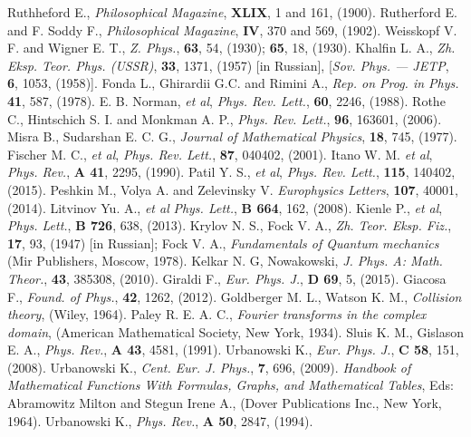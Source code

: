 \documentclass[12pt]{article}
\begin{document}
\begin{thebibliography}{19}
Ruthheford E.,
  {\em  Philosophical Magazine}, {\bf XLIX}, 1 and 161, (1900).
Rutherford E. and F. Soddy F.,
    {\em Philosophical Magazine}, {\bf IV}, 370 and 569, (1902).
Weisskopf V. F. and Wigner E. T.,
    {\em Z. Phys.}, {\bf 63}, {54}, ({1930});
    {\bf 65}, 18, ({1930}).
Khalfin L. A.,
    {\em Zh. Eksp. Teor. Phys. (USSR)}, {\bf 33}, {1371}, ({1957}) [in Russian],
    [{\em Sov. Phys. --- JETP}, {\bf 6}, {1053}, ({1958})].
Fonda L., Ghirardii G.C. and  Rimini A.,
    {\em Rep. on Prog. in Phys.} {\bf 41}, {587}, ({1978}).
E. B.  Norman, {\em et al},
    {\em Phys. Rev. Lett.}, {\bf 60},  {2246}, ({1988}).
Rothe C., Hintschich S. I. and Monkman A. P.,
    {\em Phys. Rev. Lett.}, {\bf 96}, {163601}, ({2006}).
Misra B., Sudarshan E. C. G.,
    {\em Journal of Mathematical Physics}, {\bf 18}, {745}, ({1977}).
Fischer M. C., {\em et al},
    {\em Phys. Rev. Lett.}, {\bf 87}, {040402}, ({2001}).
Itano W. M. {\em et al},
    {\em Phys. Rev.}, {\bf A 41}, {2295}, ({1990}).
Patil Y. S., {\em et al},
    {\em Phys. Rev. Lett.}, {\bf 115}, {140402}, ({2015}).
Peshkin M.,  Volya A. and  Zelevinsky V.
    {\em Europhysics Letters}, {\bf 107}, {40001}, ({2014}).
Litvinov Yu. A., {\em et al}
    {\em Phys. Lett.}, {\bf B 664}, {162}, ({2008}).
Kienle P., {\em et al},
    {\em Phys. Lett.}, {\bf B 726}, {638}, ({2013}).
Krylov N. S., Fock V. A.,
    {\em Zh. Teor. Eksp. Fiz.}, {\bf 17}, {93}, ({1947}) [in Russian];
    Fock V. A.,
    {\em Fundamentals of Quantum mechanics}
  (Mir Publishers, Moscow, 1978).
Kelkar N. G, Nowakowski,
{\em J. Phys. A: Math. Theor.}, \textbf{43}, 385308,  (2010).
 Giraldi F.,
    {\em Eur. Phys. J.}, {\bf D 69}, {5}, ({2015}).
Giacosa F.,
    {\em Found. of Phys.}, {\bf 42}, {1262}, ({2012}).
Goldberger M. L., Watson K. M.,
    {\em Collision theory},
       (Wiley, 1964).
Paley R. E. A. C.,
    {\em Fourier transforms in the complex domain},
    (American Mathematical Society, New York, 1934).
Sluis K. M., Gislason E. A.,
    {\em Phys. Rev.}, {\bf A 43}, {4581}, ({1991}).
Urbanowski K.,
    {\em Eur. Phys. J.}, {\bf C 58}, {151}, ({2008}).
 Urbanowski K.,
    {\em Cent. Eur. J. Phys.}, {\bf 7}, 696, (2009).
    {\em Handbook of Mathematical Functions With Formulas, Graphs, and Mathematical Tables},
        Eds: Abramowitz Milton and Stegun Irene A.,
        (Dover Publications Inc., New York, 1964).
 Urbanowski K.,
    {\em Phys. Rev.}, {\bf A 50}, {2847}, ({1994}).
\end{thebibliography}
\end{document}
